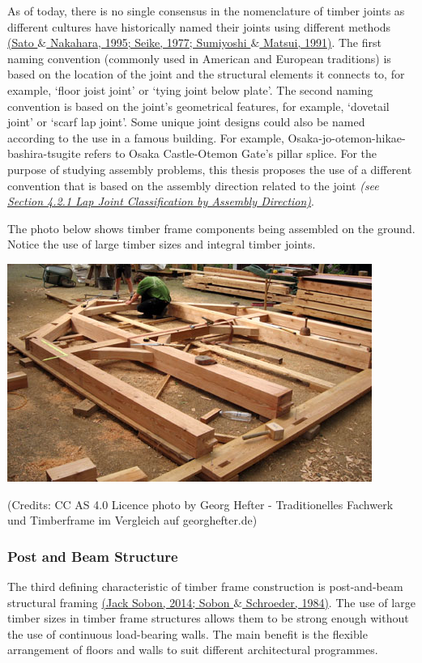\documentclass[11pt]{book}
\begin{document}
As of today, there is no single consensus in the nomenclature of timber joints as different cultures have historically named their joints using different methods \href{https://www.zotero.org/google-docs/?WvT4uQ}{(Sato $\&$ Nakahara, 1995; Seike, 1977; Sumiyoshi $\&$ Matsui, 1991)}. The first naming convention (commonly used in American and European traditions) is based on the location of the joint and the structural elements it connects to, for example, ‘floor joist joint’ or ‘tying joint below plate’. The second naming convention is based on the joint's geometrical features, for example, ‘dovetail joint’ or ‘scarf lap joint’. Some unique joint designs could also be named according to the use in a famous building. For example, Osaka-jo-otemon-hikae-bashira-tsugite refers to Osaka Castle-Otemon Gate's pillar splice. For the purpose of studying assembly problems, this thesis proposes the use of a different convention that is based on the assembly direction related to the joint \textit{(see \underline{Section 4.2.1 Lap Joint Classification by Assembly Direction)}}.

The photo below shows timber frame components being assembled on the ground. Notice the use of large timber sizes and integral timber joints. 

\includegraphics[width=11.91cm,height=7.12cm]{./images/image5.jpg} \\ {\footnotesize (Credits: CC AS 4.0 Licence photo by Georg Hefter - Traditionelles Fachwerk und Timberframe im Vergleich auf georghefter.de)\par}

\subsubsection{Post and Beam Structure}

The third defining characteristic of timber frame construction is post-and-beam structural framing \href{https://www.zotero.org/google-docs/?KMFAqo}{(Jack Sobon, 2014; Sobon $\&$ Schroeder, 1984)}. The use of large timber sizes in timber frame structures allows them to be strong enough without the use of continuous load-bearing walls. The main benefit is the flexible arrangement of floors and walls to suit different architectural programmes. 
\end{document}
